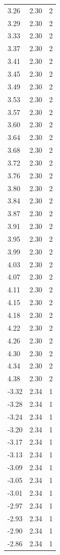 \begin{longtable}{lrr}
  3.26 & 2.30 & 2 \\
  3.29 & 2.30 & 2 \\
  3.33 & 2.30 & 2 \\
  3.37 & 2.30 & 2 \\
  3.41 & 2.30 & 2 \\
  3.45 & 2.30 & 2 \\
  3.49 & 2.30 & 2 \\
  3.53 & 2.30 & 2 \\
  3.57 & 2.30 & 2 \\
  3.60 & 2.30 & 2 \\
  3.64 & 2.30 & 2 \\
  3.68 & 2.30 & 2 \\
  3.72 & 2.30 & 2 \\
  3.76 & 2.30 & 2 \\
  3.80 & 2.30 & 2 \\
  3.84 & 2.30 & 2 \\
  3.87 & 2.30 & 2 \\
  3.91 & 2.30 & 2 \\
  3.95 & 2.30 & 2 \\
  3.99 & 2.30 & 2 \\
  4.03 & 2.30 & 2 \\
  4.07 & 2.30 & 2 \\
  4.11 & 2.30 & 2 \\
  4.15 & 2.30 & 2 \\
  4.18 & 2.30 & 2 \\
  4.22 & 2.30 & 2 \\
  4.26 & 2.30 & 2 \\
  4.30 & 2.30 & 2 \\
  4.34 & 2.30 & 2 \\
  4.38 & 2.30 & 2 \\
  -3.32 & 2.34 & 1 \\
  -3.28 & 2.34 & 1 \\
  -3.24 & 2.34 & 1 \\
  -3.20 & 2.34 & 1 \\
  -3.17 & 2.34 & 1 \\
  -3.13 & 2.34 & 1 \\
  -3.09 & 2.34 & 1 \\
  -3.05 & 2.34 & 1 \\
  -3.01 & 2.34 & 1 \\
  -2.97 & 2.34 & 1 \\
  -2.93 & 2.34 & 1 \\
  -2.90 & 2.34 & 1 \\
  -2.86 & 2.34 & 1 \\

\end{longtable}
